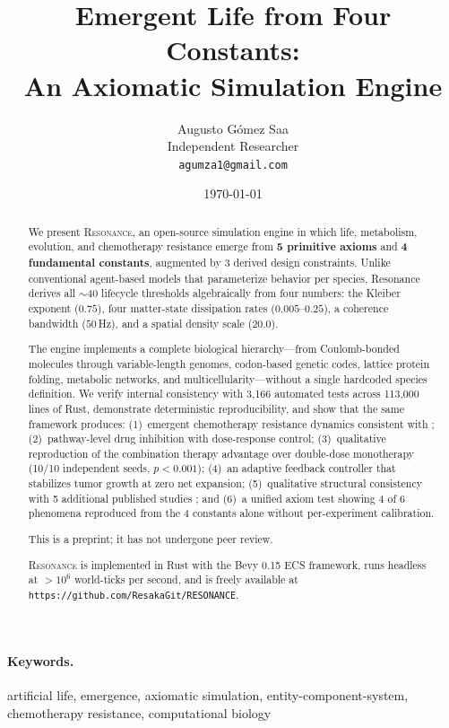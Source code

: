 \documentclass[11pt,a4paper]{article}
\title{Emergent Life from Four Constants:\\An Axiomatic Simulation Engine}
\author{
  Augusto G\'omez Saa\\
  Independent Researcher\\
  \texttt{agumza1@gmail.com}
}
\date{\today}
\begin{document}
\maketitle

\begin{abstract}
We present \textsc{Resonance}, an open-source simulation engine in which
life, metabolism, evolution, and chemotherapy resistance emerge from
\textbf{5 primitive axioms} and \textbf{4 fundamental constants},
augmented by 3 derived design constraints.
Unlike conventional agent-based models that parameterize behavior
per species, Resonance derives all ${\sim}40$ lifecycle thresholds
algebraically from four numbers: the Kleiber exponent ($0.75$),
four matter-state dissipation rates ($0.005$--$0.25$),
a coherence bandwidth ($50$\,Hz), and a spatial density scale ($20.0$).

The engine implements a complete biological hierarchy---from
Coulomb-bonded molecules through variable-length genomes,
codon-based genetic codes, lattice protein folding, metabolic
networks, and multicellularity---without
a single hardcoded species definition.
We verify internal consistency with 3{,}166 automated tests
across 113{,}000 lines of Rust, demonstrate deterministic
reproducibility, and show that the same framework produces:
(1)~emergent chemotherapy resistance dynamics consistent with
\citet{bozic2013evolutionary};
(2)~pathway-level drug inhibition with dose-response control;
(3)~qualitative reproduction of the combination therapy advantage
over double-dose monotherapy (10/10 independent seeds, $p < 0.001$);
(4)~an adaptive feedback controller that stabilizes tumor
growth at zero net expansion;
(5)~qualitative structural consistency with 5 additional published
studies \citep{zhang2022evolution,sharma2010chromatin,garnett2012systematic,foo2009evolution,michor2005dynamics};
and (6)~a unified axiom test showing 4 of 6 phenomena reproduced
from the 4 constants alone without per-experiment calibration.

This is a preprint; it has not undergone peer review.

\textsc{Resonance} is implemented in Rust with the Bevy 0.15 ECS
framework, runs headless at $>10^6$ world-ticks per second,
and is freely available at \texttt{https://github.com/ResakaGit/RESONANCE}.
\end{abstract}

\paragraph{Keywords.}
artificial life, emergence, axiomatic simulation, entity-component-system,
chemotherapy resistance, computational biology
\end{document}

